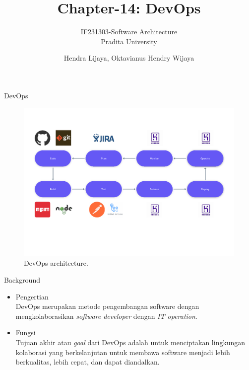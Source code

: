 \documentclass{beamer}
\title{Chapter-14: DevOps}
\subtitle{IF231303-Software Architecture\\Pradita University}
\author{Hendra Lijaya, Oktavianus Hendry Wijaya}
\begin{document}
	
	\begin{frame}[plain]
		\maketitle
	\end{frame}
	
	\begin{frame}{DevOps}
		\begin{figure}[h]
			\centering
			\includegraphics[width=\textwidth]{Arsitektur DevOps}
			\caption{DevOps architecture.}
			\label{fig:DevOps}
		\end{figure}
	\end{frame}
	
	\begin{frame}{Background}
		\begin{itemize}
			\item Pengertian
			\\DevOps merupakan metode pengembangan software dengan mengkolaborasikan \textit{software developer} dengan \textit{IT operation}. 
			\item Fungsi
			\\Tujuan akhir atau \textit{goal} dari DevOps adalah untuk menciptakan lingkungan kolaborasi yang berkelanjutan untuk membawa software menjadi lebih berkualitas, lebih cepat, dan dapat diandalkan.
		\end{itemize}
	\end{frame}
	
\end{document}
